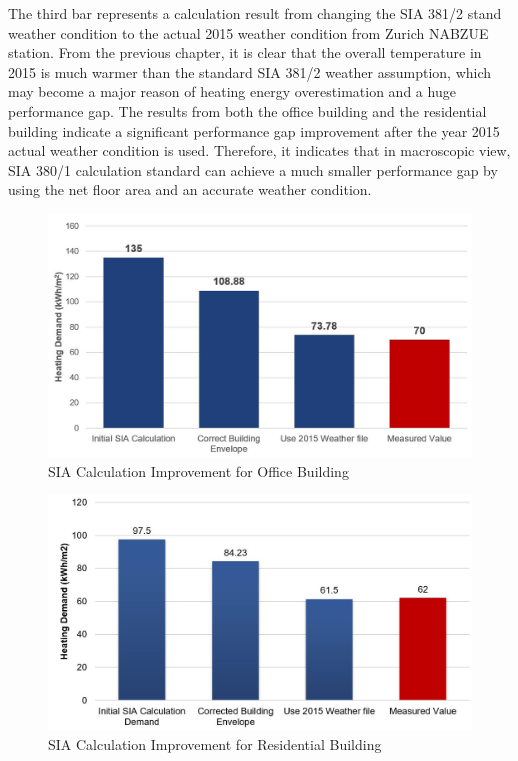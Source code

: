\documentclass[a4paper, oneside]{discothesis}
\begin{document}
		The third bar represents a calculation result from changing the SIA 381/2 stand weather condition to the actual 2015 weather condition from Zurich NABZUE station. From the previous chapter, it is clear that the overall temperature in 2015 is much warmer than the standard SIA 381/2 weather assumption, which may become a major reason of heating energy overestimation and a huge performance gap. The results from both the office building and the residential building indicate a significant performance gap improvement after the year 2015 actual weather condition is used. Therefore, it indicates that in macroscopic view, SIA 380/1 calculation standard can achieve a much smaller performance gap by using the net floor area and an accurate weather condition. 

		\begin{figure}[htbp]
		\centering
		\includegraphics[scale=0.46]{Office_SIA.jpg}
		\caption{SIA Calculation Improvement for Office Building}
		\label{fig:Sumatra_SIA}
		\end{figure}
		
		\begin{figure}[htbp]
		\centering
		\includegraphics[scale=0.46]{Residential_SIA.jpg}
		\caption{SIA Calculation Improvement for Residential Building}
		\label{fig:Hongger_SIA}
		\end{figure}
		
\end{document}

